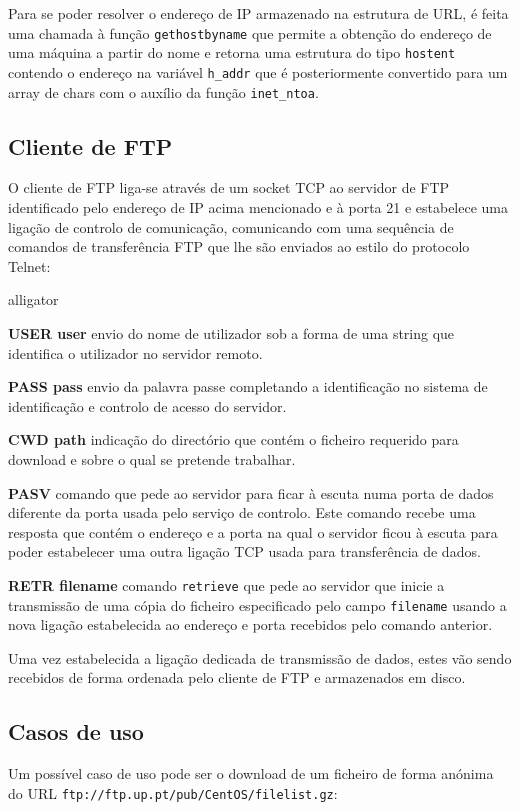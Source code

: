 \documentclass[a4paper,11pt,titlepage]{article}
\begin{document}
Para se poder resolver o endereço de IP armazenado na estrutura de URL, é feita
uma chamada à função \texttt{gethostbyname} que permite a obtenção do endereço
de uma máquina a partir do nome e retorna uma estrutura do tipo
\texttt{hostent} contendo o endereço na variável \texttt{h\_addr} que é
posteriormente convertido para um array de chars com o auxílio da função
\texttt{inet\_ntoa}.

\subsection*{Cliente de FTP}
O cliente de FTP liga-se através de um socket TCP ao servidor de FTP
identificado pelo endereço de IP acima mencionado e à porta 21 e estabelece uma
ligação de controlo de comunicação, comunicando com uma sequência de comandos
de transferência FTP que lhe são enviados ao estilo do protocolo Telnet: 

\begin{labeling}{alligator}
\item [\textbf{USER user}] envio do nome de utilizador sob a forma de uma string que identifica o utilizador no servidor remoto.
\item [\textbf{PASS pass}] envio da palavra passe completando a identificação no sistema de identificação e controlo de acesso do servidor.
\item [\textbf{CWD path}] indicação do directório que contém o ficheiro requerido para download e sobre o qual se pretende trabalhar.
\item [\textbf{PASV}] comando que pede ao servidor para ficar à escuta numa porta de dados diferente da porta usada pelo serviço de controlo. Este comando recebe uma resposta que contém o endereço e a porta na qual o servidor ficou à escuta para poder estabelecer uma outra ligação TCP usada para transferência de dados.
\item [\textbf{RETR filename}] comando \texttt{retrieve} que pede ao servidor que inicie a transmissão de uma cópia do ficheiro especificado pelo campo \texttt{filename} usando a nova ligação estabelecida ao endereço e porta recebidos pelo comando anterior.
\end{labeling}

Uma vez estabelecida a ligação dedicada de transmissão de dados, estes vão
sendo recebidos de forma ordenada pelo cliente de FTP e armazenados em disco.

\subsection*{Casos de uso}
Um possível caso de uso pode ser o download de um ficheiro de forma anónima do
URL \texttt{ftp://ftp.up.pt/pub/CentOS/filelist.gz}:
\end{document}
